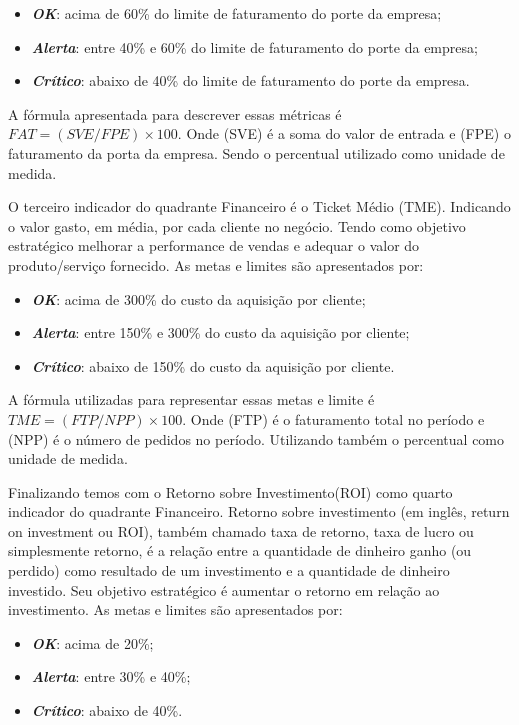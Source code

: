 \documentclass[
	12pt,				%
	openright,			%
	oneside,			%
	a4paper,			%
	english,			%
	brazil				%
	]{abntex2}
\begin{document}
\begin{itemize}
\item  \textbf{\textit{OK}}: acima de 60\% do limite de faturamento do porte da empresa;
\item  \textbf{\textit{Alerta}}: entre 40\% e 60\% do limite de faturamento do porte da empresa;
\item  \textbf{\textit{Crítico}}: abaixo de 40\% do limite de faturamento do porte da empresa.
\end{itemize}

A fórmula apresentada para descrever essas métricas é $FAT = (SVE/FPE) 	\times 100$. Onde (SVE) é a soma do valor de entrada e (FPE) o faturamento da porta da empresa. Sendo o percentual utilizado como unidade de medida.

O terceiro indicador do quadrante Financeiro é o Ticket Médio (TME). Indicando o valor gasto, em média, por cada cliente no negócio. Tendo como objetivo estratégico melhorar a performance de vendas e adequar o valor do produto/serviço fornecido. As metas e limites são apresentados por:
\begin{itemize}
\item  \textbf{\textit{OK}}: acima de 300\% do custo da aquisição por cliente;
\item  \textbf{\textit{Alerta}}: entre 150\% e 300\% do custo da aquisição por cliente;
\item  \textbf{\textit{Crítico}}: abaixo de 150\% do custo da aquisição por cliente.
\end{itemize}

A fórmula utilizadas para representar essas metas e limite é $TME = (FTP/NPP) \times 100$. Onde (FTP) é o faturamento total no período e (NPP) é o número de pedidos no período. Utilizando também o percentual como unidade de medida.

Finalizando temos com o Retorno sobre Investimento(ROI) como quarto indicador do quadrante Financeiro. Retorno sobre investimento (em inglês, return on investment ou ROI), também chamado taxa de retorno, taxa de lucro ou simplesmente retorno, é a relação entre a quantidade de dinheiro ganho (ou perdido) como resultado de um investimento e a quantidade de dinheiro investido. Seu objetivo estratégico é aumentar o retorno em relação ao investimento. As metas e limites são apresentados por:
\begin{itemize}
\item  \textbf{\textit{OK}}: acima de 20\%;
\item  \textbf{\textit{Alerta}}: entre 30\% e 40\%;
\item  \textbf{\textit{Crítico}}: abaixo de 40\%.
\end{itemize}
\end{document}
